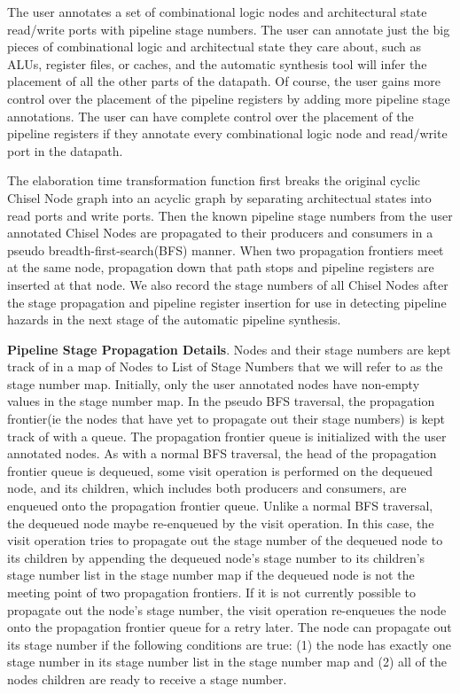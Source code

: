 The user annotates a set of combinational logic nodes
and architectural state read/write ports with pipeline stage
numbers. The user can annotate just the big pieces of combinational
logic and architectual state they care about, such as ALUs, register
files, or caches, and the automatic synthesis tool will infer the
placement of all the other parts of the datapath. Of course, the user
gains more control over the placement of the pipeline registers by
adding more pipeline stage annotations. The user can have complete
control over the placement of the pipeline registers if they annotate
every combinational logic node and read/write port in the datapath. 

The elaboration time transformation function
first breaks the original cyclic Chisel Node graph into an acyclic
graph by separating architectual states into read ports and write
ports. Then the known pipeline stage numbers from the user annotated
Chisel Nodes are propagated to their producers and consumers in a
pseudo breadth-first-search(BFS) manner. When two propagation
frontiers meet at the same node, propagation down that path stops and
pipeline registers are inserted at that node. We also record the stage
numbers of all Chisel Nodes after the stage propagation and pipeline
register insertion for use in detecting pipeline hazards in the next
stage of the automatic pipeline synthesis. 

{\bf Pipeline Stage Propagation Details}. Nodes and their stage
numbers are kept track of in a map of Nodes to List of Stage Numbers
that we will refer to as the stage number map. Initially, only the
user annotated nodes have non-empty values in the stage number map. In
the pseudo BFS traversal, the propagation frontier(ie the nodes that
have yet to propagate out their stage numbers) is kept track of with a
queue. The propagation frontier queue is initialized with the user
annotated nodes. As with a normal BFS traversal, the head of the
propagation frontier queue is dequeued, some visit operation is
performed on the dequeued node, and its children, which includes both
producers and consumers, are enqueued onto the propagation frontier
queue. Unlike a normal BFS traversal, the dequeued node maybe
re-enqueued by the visit operation. In this case, the visit operation
tries to propagate out the stage number of the dequeued node to its
children by appending the dequeued node's stage number to its
children's stage number list in the stage number map if the dequeued
node is not the meeting point of two propagation frontiers. If it is
not currently possible to propagate out the node's stage number, the
visit operation re-enqueues the node onto the propagation frontier
queue for a retry later. The node can propagate out its stage number
if the following conditions are true: (1) the node has exactly one
stage number in its stage number list in the stage number map and (2)
all of the nodes children are ready to receive a stage number.  

